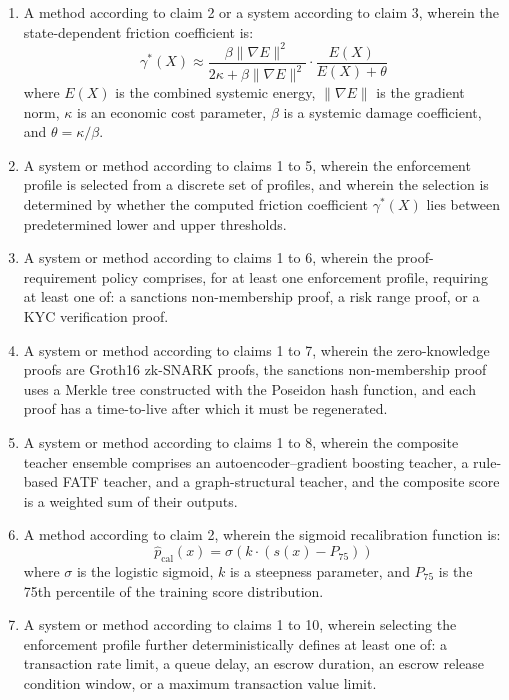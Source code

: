 \documentclass[12pt,a4paper]{article}
\begin{document}
\begin{enumerate}[label=\textbf{\arabic*.}]
\item A method according to claim 2 or a system according to claim 3,
wherein the state-dependent friction coefficient is:
\[
\gamma^*(X) \approx \frac{\beta\|\nabla E\|^2}{2\kappa+\beta\|\nabla E\|^2}
\cdot\frac{E(X)}{E(X)+\theta}
\]
where $E(X)$ is the combined systemic energy, $\|\nabla E\|$ is the
gradient norm, $\kappa$ is an economic cost parameter, $\beta$ is a systemic
damage coefficient, and $\theta=\kappa/\beta$.

\item A system or method according to claims 1 to 5, wherein the
enforcement profile is selected from a discrete set of profiles, and
wherein the selection is determined by whether the computed friction
coefficient $\gamma^*(X)$ lies between predetermined lower and upper
thresholds.

\item A system or method according to claims 1 to 6, wherein the
proof-requirement policy comprises, for at least one enforcement profile,
requiring at least one of: a sanctions non-membership proof, a risk range
proof, or a KYC verification proof.

\item A system or method according to claims 1 to 7, wherein the
zero-knowledge proofs are Groth16 zk-SNARK proofs, the sanctions
non-membership proof uses a Merkle tree constructed with the Poseidon hash
function, and each proof has a time-to-live after which it must be
regenerated.

\item A system or method according to claims 1 to 8, wherein the composite
teacher ensemble comprises an autoencoder--gradient boosting teacher, a
rule-based FATF teacher, and a graph-structural teacher, and the composite
score is a weighted sum of their outputs.

\item A method according to claim 2, wherein the sigmoid recalibration
function is:
\[
\hat{p}_{\mathrm{cal}}(x) = \sigma\!\left(k\cdot(s(x)-P_{75})\right)
\]
where $\sigma$ is the logistic sigmoid, $k$ is a steepness parameter, and
$P_{75}$ is the 75th percentile of the training score distribution.

\item A system or method according to claims 1 to 10, wherein selecting
the enforcement profile further deterministically defines at least one of:
a transaction rate limit, a queue delay, an escrow duration, an escrow
release condition window, or a maximum transaction value limit.


\end{enumerate}
\end{document}
